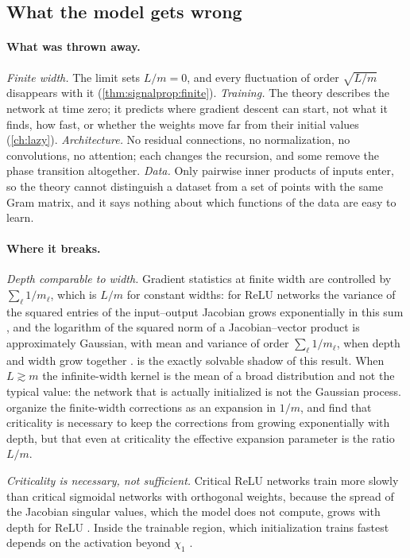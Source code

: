\begin{refsection}
\section{What the model gets wrong}\label{sec:signalprop:wrong}

\paragraph{What was thrown away.} \emph{Finite width.} The limit sets $L/m=0$, and every fluctuation of order $\sqrt{L/m}$ disappears with it (\cref{thm:signalprop:finite}). \emph{Training.} The theory describes the network at time zero; it predicts where gradient descent can start, not what it finds, how fast, or whether the weights move far from their initial values (\cref{ch:lazy}). \emph{Architecture.} No residual connections, no normalization, no convolutions, no attention; each changes the recursion, and some remove the phase transition altogether. \emph{Data.} Only pairwise inner products of inputs enter, so the theory cannot distinguish a dataset from a set of points with the same Gram matrix, and it says nothing about which functions of the data are easy to learn.

\paragraph{Where it breaks.} \emph{Depth comparable to width.} Gradient statistics at finite width are controlled by $\sum_\ell1/m_\ell$, which is $L/m$ for constant widths: for ReLU networks the variance of the squared entries of the input--output Jacobian grows exponentially in this sum \parencite{Hanin2018}, and the logarithm of the squared norm of a Jacobian--vector product is approximately Gaussian, with mean and variance of order $\sum_\ell1/m_\ell$, when depth and width grow together \parencite{HaninNica2020}.  is the exactly solvable shadow of this result. When $L\gtrsim m$ the infinite-width kernel is the mean of a broad distribution and not the typical value: the network that is actually initialized is not the Gaussian process. \Textcite{RobertsEtAl2022} organize the finite-width corrections as an expansion in $1/m$, and find that criticality is necessary to keep the corrections from growing exponentially with depth, but that even at criticality the effective expansion parameter is the ratio $L/m$.

\emph{Criticality is necessary, not sufficient.} Critical ReLU networks train more slowly than critical sigmoidal networks with orthogonal weights, because the spread of the Jacobian singular values, which the model does not compute, grows with depth for ReLU \parencite{PenningtonEtAl2017}. Inside the trainable region, which initialization trains fastest depends on the activation beyond $\chi_1$ \parencite{HayouEtAl2019}.


\end{refsection}
